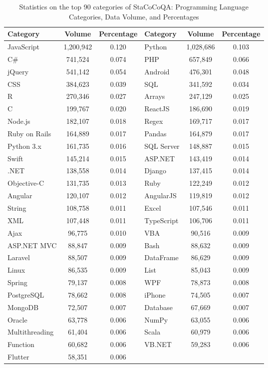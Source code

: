 \begin{table*}[h]
\centering
  \renewcommand{\arraystretch}{1.2}
  \tabcolsep=0.44cm
\caption{Statistics on the top 90 categories of StaCoCoQA: Programming Language Categories, Data Volume, and Percentages}
\begin{adjustbox}{width=\linewidth}  
\begin{tabular}{lcc | lcc}
\toprule
\textbf{Category} & \textbf{Volume} & \textbf{Percentage} & \textbf{Category} & \textbf{Volume} & \textbf{Percentage} \\
\midrule
JavaScript & 1,200,942 & 0.120 & Python & 1,028,686 & 0.103 \\
C\# & 741,524 & 0.074 & PHP & 657,849 & 0.066 \\
jQuery & 541,142 & 0.054 & Android & 476,301 & 0.048 \\
CSS & 384,623 & 0.039 & SQL & 341,592 & 0.034 \\
R & 270,346 & 0.027 & Arrays & 247,129 & 0.025 \\
C & 199,767 & 0.020 & ReactJS & 186,690 & 0.019 \\
Node.js & 182,107 & 0.018 & Regex & 169,717 & 0.017 \\
Ruby on Rails & 164,889 & 0.017 & Pandas & 164,879 & 0.017 \\
Python 3.x & 161,735 & 0.016 & SQL Server & 148,887 & 0.015 \\
Swift & 145,214 & 0.015 & ASP.NET & 143,419 & 0.014 \\
.NET & 138,558 & 0.014 & Django & 137,415 & 0.014 \\
Objective-C & 131,735 & 0.013 & Ruby & 122,249 & 0.012 \\
Angular & 120,107 & 0.012 & AngularJS & 119,819 & 0.012 \\
String & 108,758 & 0.011 & Excel & 107,546 & 0.011 \\
XML & 107,448 & 0.011 & TypeScript & 106,706 & 0.011 \\
Ajax & 96,775 & 0.010 & VBA & 90,516 & 0.009 \\
ASP.NET MVC & 88,847 & 0.009 & Bash & 88,632 & 0.009 \\
Laravel & 88,507 & 0.009 & DataFrame & 86,629 & 0.009 \\
Linux & 86,535 & 0.009 & List & 85,043 & 0.009 \\
Spring & 79,137 & 0.008 & WPF & 78,873 & 0.008 \\
PostgreSQL & 78,662 & 0.008 & iPhone & 74,505 & 0.007 \\
MongoDB & 72,507 & 0.007 & Database & 67,669 & 0.007 \\
Oracle & 63,778 & 0.006 & NumPy & 63,055 & 0.006 \\
Multithreading & 61,404 & 0.006 & Scala & 60,979 & 0.006 \\
Function & 60,682 & 0.006 & VB.NET & 59,283 & 0.006 \\
Flutter & 58,351 & 0.006 & & & \\
\bottomrule
\end{tabular}
\end{adjustbox}
\label{tab:stacocoqa_tags}
\end{table*}




